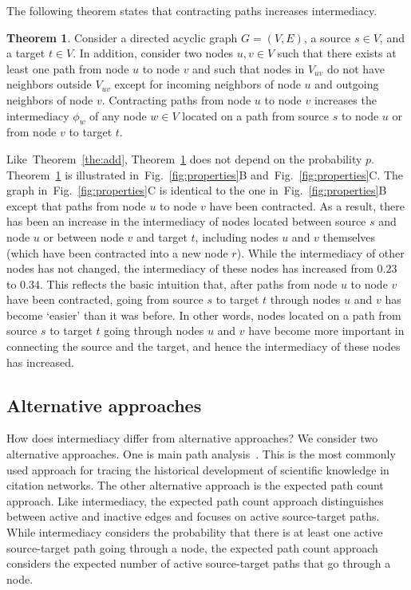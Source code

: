\documentclass[9pt,twocolumn,twoside]{pnas-alt} %
\theoremstyle{definition}
\newtheorem{theorem}{Theorem}
\newcommand{\subfigref}[2]{Fig.~\ref{fig:#1}#2\xspace}
\newcommand{\theref}[1]{Theorem~\ref{the:#1}\xspace}
\begin{document}
The following theorem states that contracting paths increases intermediacy.

\begin{theorem}
    Consider a directed acyclic graph $G = (V, E)$, a source $s \in V$, and a target $t \in V$. In addition, consider two nodes $u, v \in V$ such that there exists at least one path from node $u$ to node $v$ and such that nodes in $V_{uv}$ do not have neighbors outside $V_{uv}$ except for incoming neighbors of node $u$ and outgoing neighbors of node $v$. Contracting paths from node $u$ to node $v$ increases the intermediacy $\phi_w$ of any node $w \in V$ located on a path from source $s$ to node $u$ or from node $v$ to target $t$.
    \label{the:cont}
\end{theorem}

Like~\theref{add}, \theref{cont} does not depend on the probability $p$. \theref{cont} is illustrated in~\subfigref{properties}{B} and~\subfigref{properties}{C}. The graph in~\subfigref{properties}{C} is identical to the one in~\subfigref{properties}{B} except that paths from node $u$ to node $v$ have been contracted. As a result, there has been an increase in the intermediacy of nodes located between source $s$ and node $u$ or between node $v$ and target $t$, including nodes $u$ and $v$ themselves (which have been contracted into a new node $r$). While the intermediacy of other nodes has not changed, the intermediacy of these nodes has increased from $0.23$ to $0.34$. This reflects the basic intuition that, after paths from node $u$ to node $v$ have been contracted, going from source $s$ to target $t$ through nodes $u$ and $v$ has become `easier' than it was before. In other words, nodes located on a path from source $s$ to target $t$ going through nodes $u$ and $v$ have become more important in connecting the source and the target, and hence the intermediacy of these nodes has increased.

%
%

\subsection*{\label{sec:alternative}Alternative approaches}

How does intermediacy differ from alternative approaches? We consider two alternative approaches. One is main path analysis~\cite{Hummon1989}. This is the most commonly used approach for tracing the historical development of scientific knowledge in citation networks. The other alternative approach is the expected path count approach. Like intermediacy, the expected path count approach distinguishes between active and inactive edges and focuses on active source-target paths. While intermediacy considers the probability that there is at least one active source-target path going through a node, the expected path count approach considers the expected number of active source-target paths that go through a node.
\end{document}
